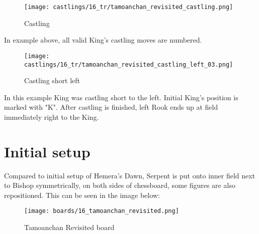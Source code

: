 \noindent
\begin{figure}[!h]
\texttt{[image: castlings/16\_tr/tamoanchan\_revisited\_castling.png]}
\caption{Castling}
\label{fig:tamoanchan_revisited_castling}
\end{figure}

In example above, all valid King's castling moves are numbered.

\noindent
\begin{figure}[!h]
\texttt{[image: castlings/16\_tr/tamoanchan\_revisited\_castling\_left\_03.png]}
\caption{Castling short left}
\label{fig:tamoanchan_revisited_castling_left_03}
\end{figure}

In this example King was castling short to the left. Initial King's position is
marked with "K". After castling is finished, left Rook ends up at field immediately
right to the King.

\clearpage %

\section*{Initial setup}
\label{sec:Tamoanchan Revisited/Initial setup}

Compared to initial setup of Hemera's Dawn, Serpent is put onto inner field next
to Bishop symmetrically, on both sides of chessboard, some figures are also
repositioned. This can be seen in the image below:

\noindent
\begin{figure}[h]
\texttt{[image: boards/16\_tamoanchan\_revisited.png]}
\caption{Tamoanchan Revisited board}
\label{fig:16_tamoanchan_revisited}
\end{figure}

\clearpage %
